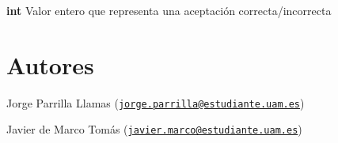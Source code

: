 \begin{DoxyItemize}
\item {\bfseries int} Valor entero que representa una aceptación correcta/incorrecta 
\end{DoxyItemize}\hypertarget{fijar_contexto_SSL_authors_6}{}\section{Autores}\label{fijar_contexto_SSL_authors_6}

\begin{DoxyItemize}
\item Jorge Parrilla Llamas (\href{mailto:jorge.parrilla@estudiante.uam.es}{\tt jorge.\+parrilla@estudiante.\+uam.\+es}) 
\item Javier de Marco Tomás (\href{mailto:javier.marco@estudiante.uam.es}{\tt javier.\+marco@estudiante.\+uam.\+es}) 
\end{DoxyItemize}